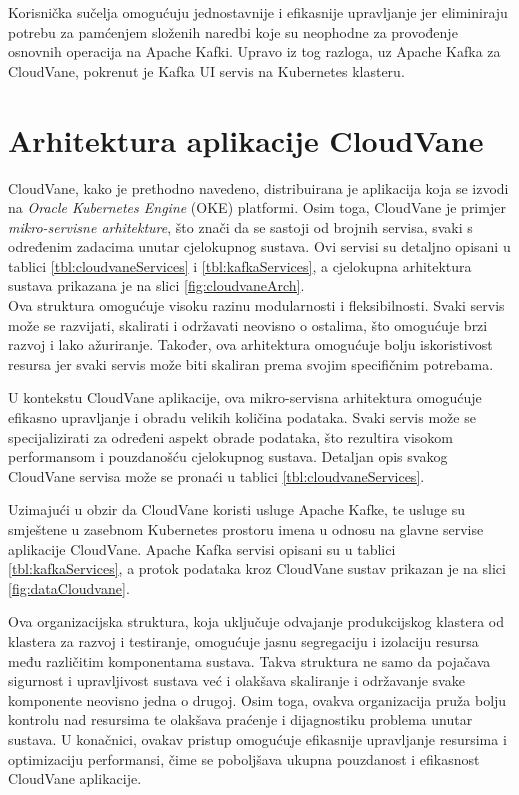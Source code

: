 \documentclass[times, utf8, diplomski]{fer}
\begin{document}
Korisnička sučelja omogućuju jednostavnije i efikasnije upravljanje jer eliminiraju potrebu za pamćenjem složenih naredbi koje su neophodne za provođenje osnovnih operacija na Apache Kafki. Upravo iz tog razloga, uz Apache Kafka za CloudVane, pokrenut je Kafka UI servis na Kubernetes klasteru.

\section{Arhitektura aplikacije CloudVane}
\label{sec:architecture}

CloudVane, kako je prethodno navedeno, distribuirana je aplikacija koja se izvodi na \emph{Oracle Kubernetes Engine} (OKE) platformi. Osim toga, CloudVane je primjer \emph{mikro-servisne arhitekture}, što znači da se sastoji od brojnih servisa, svaki s određenim zadacima unutar cjelokupnog sustava. Ovi servisi su detaljno opisani u tablici \ref{tbl:cloudvaneServices} i \ref{tbl:kafkaServices}, a cjelokupna arhitektura sustava prikazana je na slici \ref{fig:cloudvaneArch}.\\

Ova struktura omogućuje visoku razinu modularnosti i fleksibilnosti. Svaki servis može se razvijati, skalirati i održavati neovisno o ostalima, što omogućuje brzi razvoj i lako ažuriranje. Također, ova arhitektura omogućuje bolju iskoristivost resursa jer svaki servis može biti skaliran prema svojim specifičnim potrebama.

U kontekstu CloudVane aplikacije, ova mikro-servisna arhitektura omogućuje efikasno upravljanje i obradu velikih količina podataka. Svaki servis može se specijalizirati za određeni aspekt obrade podataka, što rezultira visokom performansom i pouzdanošću cjelokupnog sustava. Detaljan opis svakog CloudVane servisa može se pronaći u tablici \ref{tbl:cloudvaneServices}.

Uzimajući u obzir da CloudVane koristi usluge Apache Kafke, te usluge su smještene u zasebnom Kubernetes prostoru imena u odnosu na glavne servise aplikacije CloudVane. Apache Kafka servisi opisani su u tablici \ref{tbl:kafkaServices}, a protok podataka kroz CloudVane sustav prikazan je na slici \ref{fig:dataCloudvane}.

Ova organizacijska struktura, koja uključuje odvajanje produkcijskog klastera od klastera za razvoj i testiranje, omogućuje jasnu segregaciju i izolaciju resursa među različitim komponentama sustava. Takva struktura ne samo da pojačava sigurnost i upravljivost sustava već i olakšava skaliranje i održavanje svake komponente neovisno jedna o drugoj. Osim toga, ovakva organizacija pruža bolju kontrolu nad resursima te olakšava praćenje i dijagnostiku problema unutar sustava. U konačnici, ovakav pristup omogućuje efikasnije upravljanje resursima i optimizaciju performansi, čime se poboljšava ukupna pouzdanost i efikasnost CloudVane aplikacije.
\end{document}
